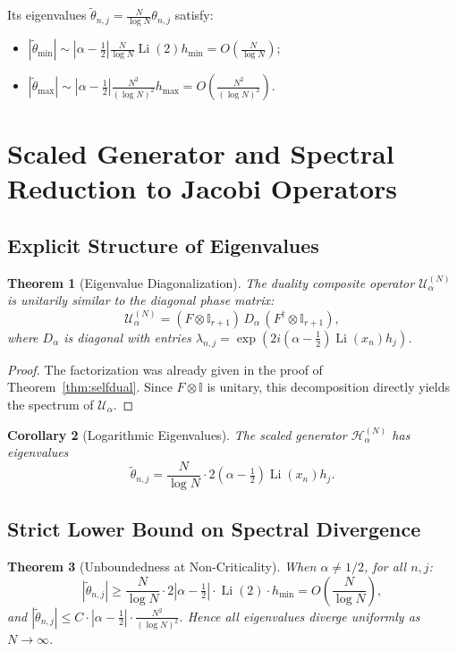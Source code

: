 \documentclass[12pt,a4paper]{amsart}
\theoremstyle{plain}
\newtheorem{theorem}{Theorem}[section]
\newtheorem{corollary}[theorem]{Corollary}
\theoremstyle{definition}
\theoremstyle{remark}
\begin{document}
Its eigenvalues $\tilde{\theta}_{n,j} = \frac{N}{\log N}\theta_{n,j}$ satisfy:
\begin{itemize}
\item $|\tilde{\theta}_{\min}| \sim |\alpha-\frac12|\frac{N}{\log N}\operatorname{Li}(2)h_{\min}=O(\frac{N}{\log N})$;
\item $|\tilde{\theta}_{\max}| \sim |\alpha-\frac12|\frac{N^2}{(\log N)^2}h_{\max}=O(\frac{N^2}{(\log N)^2})$.
\end{itemize}

\section{Scaled Generator and Spectral Reduction to Jacobi Operators}

\subsection{Explicit Structure of Eigenvalues}

\begin{theorem}[Eigenvalue Diagonalization]\label{thm:eigendiagonal}
The duality composite operator $\mathcal{U}_\alpha^{(N)}$ is unitarily similar to the diagonal phase matrix:
\[
\mathcal{U}_\alpha^{(N)} = (F\otimes\mathbb{I}_{r+1})\,D_\alpha\,(F^\dagger\otimes\mathbb{I}_{r+1}),
\]
where $D_\alpha$ is diagonal with entries $\lambda_{n,j} = \exp(2i(\alpha-\frac12)\operatorname{Li}(x_n)h_j)$.
\end{theorem}

\begin{proof}
The factorization was already given in the proof of Theorem~\ref{thm:selfdual}. Since $F\otimes\mathbb{I}$ is unitary, this decomposition directly yields the spectrum of $\mathcal{U}_\alpha$.
\end{proof}

\begin{corollary}[Logarithmic Eigenvalues]\label{cor:logeigen}
The scaled generator $\mathcal{H}_\alpha^{(N)}$ has eigenvalues
\[
\tilde{\theta}_{n,j} = \frac{N}{\log N} \cdot 2(\alpha-\tfrac{1}{2})\operatorname{Li}(x_n)h_j.
\]
\end{corollary}

\subsection{Strict Lower Bound on Spectral Divergence}

\begin{theorem}[Unboundedness at Non-Criticality]\label{thm:unbounded}
When $\alpha \neq 1/2$, for all $n,j$:
\[
|\tilde{\theta}_{n,j}| \geq \frac{N}{\log N} \cdot 2|\alpha-\tfrac{1}{2}| \cdot \operatorname{Li}(2) \cdot h_{\min} = O\left(\frac{N}{\log N}\right),
\]
and $|\tilde{\theta}_{n,j}| \leq C \cdot |\alpha-\frac{1}{2}| \cdot \frac{N^2}{(\log N)^2}$. Hence all eigenvalues diverge uniformly as $N \to \infty$.
\end{theorem}
\end{document}
